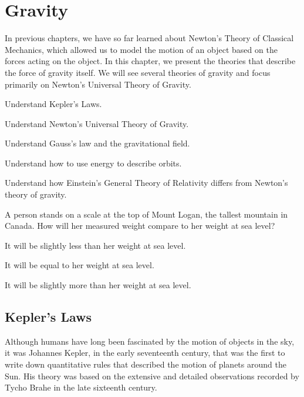 
\chapter{Gravity}
\label{chapter:gravity}
In previous chapters, we have so far learned about Newton's Theory of Classical Mechanics, which allowed us to model the motion of an object based on the forces acting on the object. In this chapter, we present the theories that describe the force of gravity itself. We will see several theories of gravity and focus primarily on Newton's Universal Theory of Gravity. 

\begin{learningObjectives}{
 \item Understand Kepler's Laws.
 \item Understand Newton's Universal Theory of Gravity. 
 \item Understand Gauss's law and the gravitational field.
 \item Understand how to use energy to describe orbits.
 \item Understand how Einstein's General Theory of Relativity differs from Newton's theory of gravity.
 }
\end{learningObjectives}

\begin{opening}
\begin{MCquestion}{A person stands on a scale at the top of Mount Logan, the tallest mountain in Canada. How will her measured weight compare to her weight at sea level?}
\item It will be slightly less than her weight at sea level. \correct
\item It will be equal to her weight at sea level.
\item It will be slightly more than her weight at sea level.
\end{MCquestion}
\end{opening}


\section{Kepler's Laws}
Although humans have long been fascinated by the motion of objects in the sky, it was Johannes Kepler, in the early seventeenth century, that was the first to write down quantitative rules that described the motion of planets around the Sun. His theory was based on the extensive and detailed observations recorded by Tycho Brahe in the late sixteenth century. 

